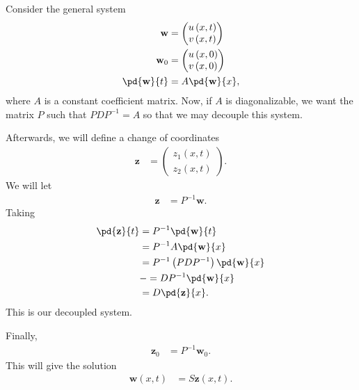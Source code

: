 \documentclass[10pt]{mypackage}
\begin{document}
\begin{example}
  Consider the general system
  \begin{align*}
    \mathbf{w} &= \begin{pmatrix}u\left( x,t \right)\\ v\left( x,t \right)\end{pmatrix}\\
    \mathbf{w}_0 &= \begin{pmatrix}u\left( x,0 \right)\\ v\left( x,0 \right)\end{pmatrix}\\
    \pd{\mathbf{w}}{t} &= A \pd{\mathbf{w}}{x},
  \end{align*}
  where $A$ is a constant coefficient matrix. Now, if $A$ is diagonalizable, we want the matrix $P$ such that $PDP^{-1} = A$ so that we may decouple this system.\newline

  Afterwards, we will define a change of coordinates
  \begin{align*}
    \mathbf{z} &= \begin{pmatrix}z_1\left( x,t \right) \\ z_2\left( x,t \right)\end{pmatrix}.
  \end{align*}
  We will let
  \begin{align*}
    \mathbf{z} &= P^{-1}\mathbf{w}.
  \end{align*}
  Taking
  \begin{align*}
    \pd{\mathbf{z}}{t} &= P^{-1} \pd{\mathbf{w}}{t}\\
                       &= P^{-1}A \pd{\mathbf{w}}{x}\\
                       &= P^{-1}\left( PDP^{-1} \right) \pd{\mathbf{w}}{x}\\
                       &-= DP^{-1} \pd{\mathbf{w}}{x}\\
                       &= D \pd{\mathbf{z}}{x}.
  \end{align*}
  This is our decoupled system.\newline

  Finally,
  \begin{align*}
    \mathbf{z}_0 &= P^{-1} \mathbf{w}_0.
  \end{align*}
  This will give the solution
  \begin{align*}
    \mathbf{w}\left( x,t \right) &= S \mathbf{z}\left( x,t \right).
  \end{align*}
  
\end{example}
\end{document}
